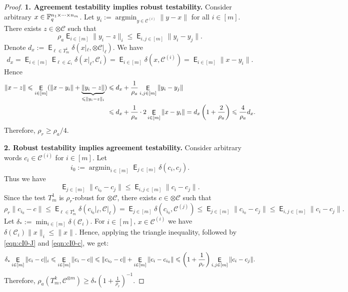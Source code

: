 \documentclass[11pt]{article}
\newcommand{\cC}{\mathcal{C}}
\newcommand{\cL}{\mathcal{L}}
\newcommand{\argmin}{\mathop{\mathrm{argmin}}}
\newcommand{\EE}{\mathop{\mathsf{E}}}
\begin{document}
\LemRobustAgreement*
\begin{proof}
    \textbf{1. Agreement testability implies robust testability.} Consider arbitrary $x\in \mathbb{F}_q^{n_1\times \cdots\times n_m}$. Let $y_i:=\argmin_{y\in \cC^{(i)}}\|y-x\|$ for all $i\in [m]$. There exists $z\in\otimes\cC$ such that 
    \[
    \rho_a\EE_{i\in[m]} \|y_i-z\|_i\le \EE_{i,j\in[m]}\|y_i-y_j\|.
    \]
    Denote $d_x:=\EE_{\ell\in T_m^1}\delta(x|_\ell, \otimes\cC|_{\ell})$. We have 
    \[
    d_x = \EE_{i\in[m]}\EE_{\ell\in\cL_i}\delta(x|_\ell, \cC_i)=\EE_{i\in[m]}\delta(x,\cC^{(i)})=\EE_{i\in[m]}\|x-y_i\|.
    \]
    Hence
    \begin{align*}
    \|x-z\| \le \EE_{i\in[m]}(\|x-y_i\|+\underbrace{\|y_i-z\|}_{\le\|y_i-z\|_i}) 
    &\le d_x+\frac1{\rho_a}\EE_{i,j\in[m]}\|y_i-y_j\|\\
    &\le d_x+\frac1{\rho_a}\cdot 2\EE_{i\in [m]}\|x-y_i\|=d_x\rbr{1+\frac{2}{\rho_a}}\le \frac{4}{\rho_a}d_x.
    \end{align*}
    Therefore, $\rho_r\ge \rho_a/4$.
    
    \textbf{2. Robust testability implies agreement testability.} 
    Consider arbitrary words $c_i\in \cC^{(i)}$ for $i\in [m]$.
    Let 
    $$i_0:=\argmin_{i\in[m]}\EE_{j\in [m]}\delta(c_i, c_j).$$
    Thus we have
    \begin{equation}\label{eqn:cI0-J}
    \EE_{j\in[m]}\|c_{i_0}- c_j\|\le \EE_{i,j\in[m]}\|c_i - c_j\|.
    \end{equation}
    Since the test $T_m^1$ is $\rho_r$-robust for $\otimes\cC$, there exists $c\in\otimes\cC$ such that 
    \begin{equation}\label{eqn:cI0-c}
    \rho_r \|c_{i_0}-c\|\le \EE_{\ell\in T_{m}^1}\delta(c_{i_0}|_{\ell}, \cC|_{\ell})= \EE_{j\in [m]}\delta(c_{i_0}, \cC^{(j)})\le \EE_{j\in[m]}\|c_{i_0} - c_j\|\le \EE_{i,j\in[m]}\|c_i- c_j\|.
    \end{equation}
    Let $\delta_*:=\min_{i\in[m]}\delta(\cC_i)$. For $i\in[m]$, $x\in\cC^{(i)}$ we have $\delta(\cC_i)\|x\|_i\le \|x\|$. Hence, applying the triangle inequality, followed by \eqref{eqn:cI0-J} and \eqref{eqn:cI0-c}, we get:
    \[
    \delta_*\EE_{i\in[m]}\|c_i-c\|_i\le \EE_{i\in[m]}\|c_i-c\|\le \|c_{i_0}-c\|+\EE_{i\in[m]}\|c_i-c_{i_0}\|
    \le \rbr{1+\frac1{\rho_r}}\EE_{i,j\in[m]}\|c_i-c_j\|.
    \]
    Therefore, 
    $\rho_a(T_m^k, \cC^{\otimes m})\ge\delta_*(1+\frac1{\rho_r})^{-1}$.
\end{proof}
\end{document}
